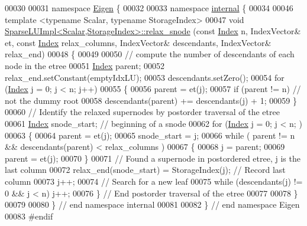 \begin{DoxyCode}
00030 
00031 \textcolor{keyword}{namespace }\hyperlink{namespace_eigen}{Eigen} \{
00032 
00033 \textcolor{keyword}{namespace }\hyperlink{namespaceinternal}{internal} \{
00034  
00046 \textcolor{keyword}{template} <\textcolor{keyword}{typename} Scalar, \textcolor{keyword}{typename} StorageIndex>
00047 \textcolor{keywordtype}{void} \hyperlink{group___sparse_l_u___module_a33672df380f94e774c5a6919d3474af4}{SparseLUImpl<Scalar,StorageIndex>::relax\_snode} (\textcolor{keyword}{const} 
      \hyperlink{namespace_eigen_a62e77e0933482dafde8fe197d9a2cfde}{Index} n, IndexVector& et, \textcolor{keyword}{const} \hyperlink{namespace_eigen_a62e77e0933482dafde8fe197d9a2cfde}{Index} relax\_columns, IndexVector& descendants, IndexVector& 
      relax\_end)
00048 \{
00049   
00050   \textcolor{comment}{// compute the number of descendants of each node in the etree}
00051   \hyperlink{namespace_eigen_a62e77e0933482dafde8fe197d9a2cfde}{Index} parent; 
00052   relax\_end.setConstant(emptyIdxLU);
00053   descendants.setZero();
00054   \textcolor{keywordflow}{for} (\hyperlink{namespace_eigen_a62e77e0933482dafde8fe197d9a2cfde}{Index} j = 0; j < n; j++) 
00055   \{
00056     parent = et(j);
00057     \textcolor{keywordflow}{if} (parent != n) \textcolor{comment}{// not the dummy root}
00058       descendants(parent) += descendants(j) + 1;
00059   \}
00060   \textcolor{comment}{// Identify the relaxed supernodes by postorder traversal of the etree}
00061   \hyperlink{namespace_eigen_a62e77e0933482dafde8fe197d9a2cfde}{Index} snode\_start; \textcolor{comment}{// beginning of a snode }
00062   \textcolor{keywordflow}{for} (\hyperlink{namespace_eigen_a62e77e0933482dafde8fe197d9a2cfde}{Index} j = 0; j < n; )
00063   \{
00064     parent = et(j);
00065     snode\_start = j; 
00066     \textcolor{keywordflow}{while} ( parent != n && descendants(parent) < relax\_columns ) 
00067     \{
00068       j = parent; 
00069       parent = et(j);
00070     \}
00071     \textcolor{comment}{// Found a supernode in postordered etree, j is the last column }
00072     relax\_end(snode\_start) = StorageIndex(j); \textcolor{comment}{// Record last column}
00073     j++;
00074     \textcolor{comment}{// Search for a new leaf}
00075     \textcolor{keywordflow}{while} (descendants(j) != 0 && j < n) j++;
00076   \} \textcolor{comment}{// End postorder traversal of the etree}
00077   
00078 \}
00079 
00080 \} \textcolor{comment}{// end namespace internal}
00081 
00082 \} \textcolor{comment}{// end namespace Eigen}
00083 \textcolor{preprocessor}{#endif}
\end{DoxyCode}
